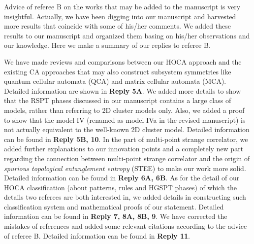\documentclass{article}
\begin{document}
\begin{tcolorbox}[title=Reply 4 (general reply),breakable, colframe=blue]
 Advice of referee B on the works that may be added to the manuscript is very insightful. Actually, we have been digging into our manuscript and harvested more results that coincide with some of his/her comments. We added these results to our manuscript and organized them basing on his/her observations and our knowledge. Here we make a summary of our replies to referee B.
\begin{outline}[itemize]
    \1 We have made reviews and comparisons between our HOCA approach and the existing CA approaches that may also construct subsystem symmetries like quantum cellular automata (QCA) and matrix cellular automata (MCA). Detailed information are shown in \textbf{Reply 5A}.
    \1 We added more details to show that the RSPT phases discussed in our manuscript contains a large class of models, rather than referring to 2D cluster models only. Also, we added a proof to show that the model-IV (renamed as model-IVa in the revised manuscript) is not actually equivalent to the well-known 2D cluster model. Detailed information can be found in \textbf{Reply 5B, 10}.
    \1 In the part of multi-point strange correlator, we added further explanations to our innovation points and a completely new part regarding the connection between multi-point strange correlator and the origin of \textit{spurious topological entanglement entropy} (STEE) to make our work more solid. Detailed information can be found in \textbf{Reply 6A, 6B}.
    \1 As for the detail of our HOCA classification (about patterns, rules and HGSPT phases) of which the details two referees are both interested in, we added details in constructing such classification system and mathematical proofs of our statement. Detailed information can be found in \textbf{Reply 7, 8A, 8B, 9}.
    \1 We have corrected the mistakes of references and added some relevant citations according to the advice of referee B. Detailed information can be found in \textbf{Reply 11}.
\end{outline}
\end{tcolorbox}
\end{document}
